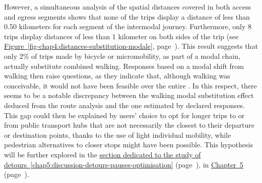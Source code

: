 \begin{refsegment}
However, a simultaneous analysis of the spatial distances covered in both access and egress segments shows that none of the trips display a distance of less than 0.50 kilometers for each segment of the intermodal journey. Furthermore, only 8 trips display distances of less than 1 kilometer on both sides of the trip (see \hyperref[fig-chap4:distances-substitution-modale]{Figure~\ref{fig-chap4:distances-substitution-modale}}, page~\pageref{fig-chap4:distances-substitution-modale}). This result suggests that only 2\% of trips made by bicycle or micromobility, as part of a modal chain, actually substitute combined walking. Responses based on a modal shift from walking then raise questions, as they indicate that, although walking was conceivable, it would not have been feasible over the entire . In this respect, there seems to be a notable discrepancy between the walking modal substitution effect deduced from the route analysis and the one estimated by declared responses. This gap could then be explained by users' choice to opt for longer trips to or from public transport hubs that are not necessarily the closest to their departure or destination points, thanks to the use of light individual mobility, while pedestrian alternatives to closer stops might have been possible. This hypothesis will be further explored in the \hyperref[chap5:discussion-detours-pauses-optimisation]{section dedicated to the study of detours~\ref{chap5:discussion-detours-pauses-optimisation}} (page~\pageref{chap5:discussion-detours-pauses-optimisation}), in \hyperref[chap5:titre]{Chapter~5} (page~\pageref{chap5:titre}).%


\end{refsegment}
